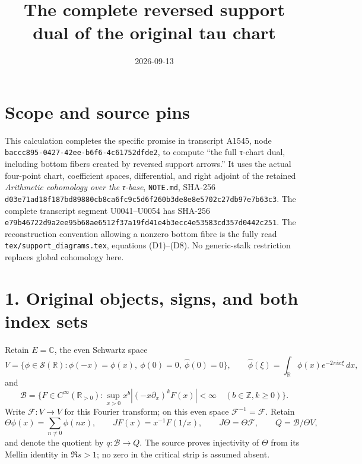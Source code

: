 \documentclass[
  11pt,
]{article}
\title{The complete reversed support dual of the original tau chart}
\author{}
\date{2026-09-13}
\begin{document}
\maketitle

\section{Scope and source pins}\label{scope-and-source-pins}

This calculation completes the specific promise in transcript A1545,
node \texttt{baccc895-0427-42ee-b6f6-4c61752dfde2}, to compute ``the
full τ-chart dual, including bottom fibers created by reversed support
arrows.'' It uses the actual four-point chart, coefficient spaces,
differential, and right adjoint of the retained \emph{Arithmetic
cohomology over the τ-base}, \texttt{NOTE.md}, SHA-256
\texttt{d03e71ad18f187bd89880cb8ca6fc9c5d6f260b3de8e8e5702c27db97e7b63c3}.
The complete transcript segment U0041--U0054 has SHA-256
\texttt{e79b46722d9a2ee95b68ae6512f37a19fd41e4b3ecc4e53583cd357d0442c251}.
The reconstruction convention allowing a nonzero bottom fibre is the
fully read \texttt{tex/support\_diagrams.tex}, equations (D1)--(D8). No
generic-stalk restriction replaces global cohomology here.

\section{1. Original objects, signs, and both index
sets}\label{original-objects-signs-and-both-index-sets}

Retain \(E=\mathbb C\), the even Schwartz space \[
V=\{\phi\in\mathcal S(\mathbb R):\phi(-x)=\phi(x),\ \phi(0)=0,\ \widehat\phi(0)=0\},
\qquad
\widehat\phi(\xi)=\int_{\mathbb R}\phi(x)e^{-2\pi i x\xi}\,dx,
\] and \[
\mathscr B=\{F\in C^\infty(\mathbb R_{>0}):
\sup_{x>0}x^b|(-x\partial_x)^kF(x)|<\infty\quad(b\in\mathbb Z,k\ge0)\}.
\] Write \(\mathcal F:V\to V\) for this Fourier transform; on this even
space \(\mathcal F^{-1}=\mathcal F\). Retain \[
\Theta\phi(x)=\sum_{n\ne0}\phi(nx),\qquad
JF(x)=x^{-1}F(1/x),\qquad J\Theta=\Theta\mathcal F,
\qquad Q=\mathscr B/\Theta V,
\] and denote the quotient by \(q:\mathscr B\to Q\). The source proves
injectivity of \(\Theta\) from its Mellin identity in \(\Re s>1\); no
zero in the critical strip is assumed absent.
\end{document}
